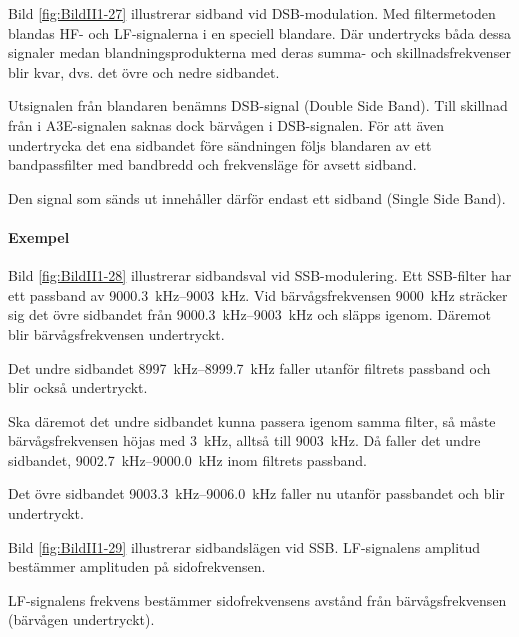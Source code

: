 Bild \ref{fig:BildII1-27} illustrerar sidband vid DSB-modulation.
Med filtermetoden blandas HF- och LF-signalerna i en speciell blandare.
Där undertrycks båda dessa signaler medan blandningsprodukterna med deras summa-
och skillnadsfrekvenser blir kvar, dvs. det övre och nedre sidbandet.

Utsignalen från blandaren benämns DSB-signal (Double Side Band).
Till skillnad från i A3E-signalen saknas dock bärvågen i DSB-signalen.
För att även undertrycka det ena sidbandet före sändningen följs blandaren
av ett bandpassfilter med bandbredd och frekvensläge för avsett sidband.

Den signal som sänds ut innehåller därför endast ett sidband (Single Side Band).

\newpage

\paragraph{Exempel}


Bild \ref{fig:BildII1-28} illustrerar sidbandsval vid SSB-modulering.
Ett SSB-filter har ett passband av \SIrange{9000,3}{9003}{\kilo\hertz}.
Vid bärvågsfrekvensen \SI{9000}{\kilo\hertz} sträcker sig det övre sidbandet
från \SIrange{9000,3}{9003}{\kilo\hertz} och släpps igenom.
Däremot blir bärvågsfrekvensen undertryckt.

Det undre sidbandet \SIrange{8997}{8999,7}{\kilo\hertz} faller utanför filtrets
passband och blir också undertryckt.

Ska däremot det undre sidbandet kunna passera igenom samma filter, så måste
bärvågsfrekvensen höjas med \SI{3}{\kilo\hertz}, alltså till
\SI{9003}{\kilo\hertz}.
Då faller det undre sidbandet, \SIrange{9002,7}{9000,0}{\kilo\hertz} inom
filtrets passband.

Det övre sidbandet \SIrange{9003,3}{9006,0}{\kilo\hertz} faller nu utanför
passbandet och blir undertryckt.


Bild \ref{fig:BildII1-29} illustrerar sidbandslägen vid SSB.
LF-signalens amplitud bestämmer amplituden på sidofrekvensen.

LF-signalens frekvens bestämmer sidofrekvensens avstånd från bärvågsfrekvensen
(bärvågen undertryckt).


